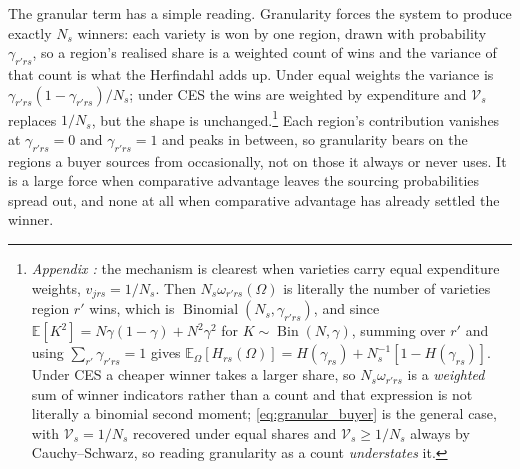 The granular term has a simple reading. Granularity forces the system to produce exactly $N_{s}$ winners: each variety is won by one region, drawn with probability $\gamma_{r'rs}$, so a region's realised share is a weighted count of wins and the variance of that count is what the Herfindahl adds up. Under equal weights the variance is $\gamma_{r'rs}(1-\gamma_{r'rs})/N_{s}$; under CES the wins are weighted by expenditure and $\mathcal{V}_{s}$ replaces $1/N_{s}$, but the shape is unchanged.\footnote{\emph{Appendix :} the mechanism is clearest when varieties carry equal expenditure weights, $v_{jrs}=1/N_{s}$. Then $N_{s}\omega_{r'rs}(\Omega)$ is literally the number of varieties region $r'$ wins, which is $\operatorname{Binomial}(N_{s},\gamma_{r'rs})$, and since $\mathbb{E}[K^{2}]=N\gamma(1-\gamma)+N^{2}\gamma^{2}$ for $K\sim\operatorname{Bin}(N,\gamma)$, summing over $r'$ and using $\sum_{r'}\gamma_{r'rs}=1$ gives $\mathbb{E}_{\Omega}[H_{rs}(\Omega)]=H(\gamma_{rs})+N_{s}^{-1}[1-H(\gamma_{rs})]$. Under CES a cheaper winner takes a larger share, so $N_{s}\omega_{r'rs}$ is a \emph{weighted} sum of winner indicators rather than a count and that expression is not literally a binomial second moment; \eqref{eq:granular_buyer} is the general case, with $\mathcal{V}_{s}=1/N_{s}$ recovered under equal shares and $\mathcal{V}_{s}\ge 1/N_{s}$ always by Cauchy--Schwarz, so reading granularity as a count \emph{understates} it. } Each region's contribution vanishes at $\gamma_{r'rs}=0$ and $\gamma_{r'rs}=1$ and peaks in between, so granularity bears on the regions a buyer sources from occasionally, not on those it always or never uses. It is a large force when comparative advantage leaves the sourcing probabilities spread out, and none at all when comparative advantage has already settled the winner.

